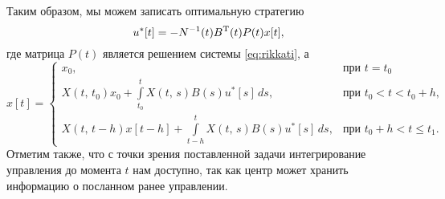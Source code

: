 Таким образом, мы можем записать оптимальную стратегию
\begin{equation} \label{eq:opt_control}
u^*[t] = -N^{-1}(t)B^\mathrm{T}(t) P(t)x[t],
\end{equation}
где матрица $P(t)$ является решением системы \eqref{eq:rikkati}, а 
\begin{equation*}
x[t] =
\begin{cases}
x_0,&\mbox{при }t = t_0\\
X(t,\,t_0)x_0 + \int\limits_{t_0}^{t}X(t,\,s)B(s)u^*[s]\,ds,
&\mbox{при }t_0 < t < t_0 + h,\\
X(t,\,t - h)x[t-h] + \int\limits_{t - h}^{t}X(t,\,s)B(s)u^*[s]\,ds,
&\mbox{при } t_0 + h < t \leqslant t_1.
\end{cases}
\end{equation*}
Отметим также, что с точки зрения поставленной задачи интегрирование управления до момента $t$ нам доступно, так как центр может хранить информацию о посланном ранее управлении.